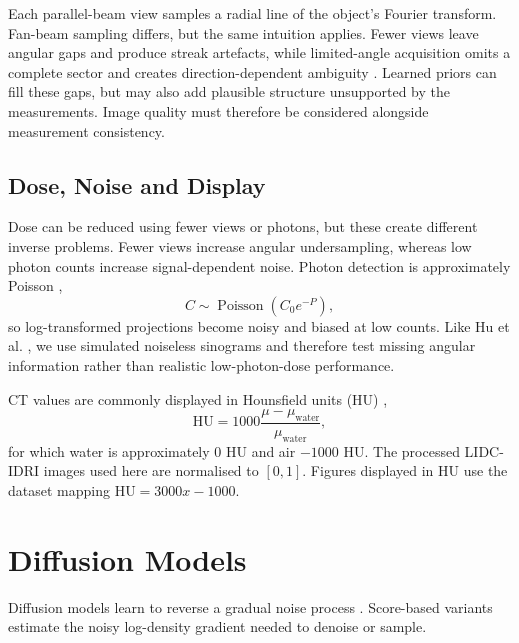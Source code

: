 Each parallel-beam view samples a radial line of the object's Fourier transform. Fan-beam sampling differs, but the same intuition applies. Fewer views leave angular gaps and produce streak artefacts, while limited-angle acquisition omits a complete sector and creates direction-dependent ambiguity \cite{}. Learned priors can fill these gaps, but may also add plausible structure unsupported by the measurements. Image quality must therefore be considered alongside measurement consistency.

\subsection{Dose, Noise and Display}
\label{subsec:ct_noise_display}

Dose can be reduced using fewer views or photons, but these create different inverse problems. Fewer views increase angular undersampling, whereas low photon counts increase signal-dependent noise. Photon detection is approximately Poisson \cite{},
\begin{equation}
C\sim\operatorname{Poisson}\!\left(C_0e^{-P}\right),
\label{eq:poisson_photon_count}
\end{equation}
so log-transformed projections become noisy and biased at low counts. Like Hu et al. \cite{}, we use simulated noiseless sinograms and therefore test missing angular information rather than realistic low-photon-dose performance.

CT values are commonly displayed in Hounsfield units (HU) \cite{},
\begin{equation}
\mathrm{HU}=1000\frac{\mu-\mu_{\mathrm{water}}}{\mu_{\mathrm{water}}},
\label{eq:hounsfield_units}
\end{equation}
for which water is approximately \(0\) HU and air \(-1000\) HU. The processed LIDC-IDRI images used here are normalised to \([0,1]\). Figures displayed in HU use the dataset mapping \(\mathrm{HU}=3000x-1000\).
\section{Diffusion Models}
\label{sec:diffusion_models}

Diffusion models learn to reverse a gradual noise process \cite{}. Score-based variants estimate the noisy log-density gradient needed to denoise or sample.


